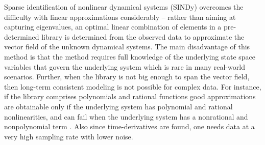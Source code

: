 \documentclass[12 pt]{article}
\begin{document}

Sparse identification of nonlinear dynamical systems (SINDy)
\cite{brunton2016discovering,champion2019data} overcomes the difficulty with linear approximations considerably -- rather than aiming at capturing eigenvalues, an optimal linear combination of elements in a pre-determined library is determined from the observed data to approximate the vector field of the unknown dynamical systems. The main disadvantage of this method is that the method requires full knowledge of the underlying state space variables that govern the underlying system which is rare in many real-world scenarios. Further, when the library is not big enough to span the vector field, then long-term consistent modeling is not possible for complex data.  For instance, if the library comprises polynomials and rational functions good approximations are obtainable only if the underlying system has polynomial and rational nonlinearities, and can fail when the underlying system has a nonrational and nonpolynomial term \cite{pan2018long}. Also since time-derivatives are found, one needs data at a very high sampling rate with lower noise. 
\end{document}
